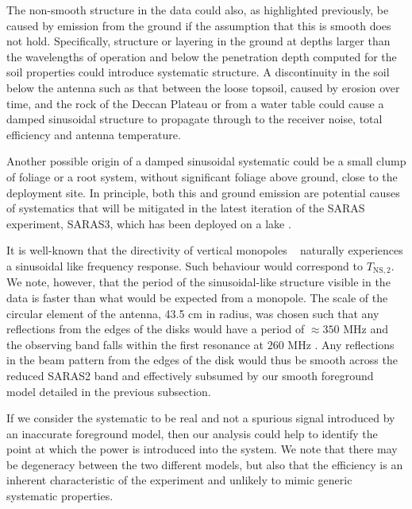 The non-smooth structure in the data could also, as highlighted previously, be caused by emission from the ground if the assumption that this is smooth does not hold. Specifically, structure or layering in the ground at depths larger than the wavelengths of operation and below the penetration depth computed for the soil properties could introduce systematic structure. A discontinuity in the soil below the antenna such as that between the loose topsoil, caused by erosion over time, and the rock of the Deccan Plateau or from a water table could cause a damped sinusoidal structure to propagate through to the receiver noise, total efficiency and antenna temperature.

Another possible origin of a damped sinusoidal systematic could be a small clump of foliage or a root system, without significant foliage above ground, close to the deployment site. In principle, both this and ground emission are potential causes of systematics that will be mitigated in the latest iteration of the SARAS experiment, SARAS3, which has been deployed on a lake \citep{SARAS3_spectrometer_2020, SARAS_reciever_2021, SARAS3_antenna_2021}.

It is well-known that the directivity of vertical monopoles ~\citep{5492282} naturally experiences a sinusoidal like frequency response. Such behaviour would correspond to $T_\mathrm{NS, 2}$. We note, however, that the period of the sinusoidal-like structure visible in the data is faster than what would be expected from a monopole. The scale of the circular element of the antenna, 43.5 cm in radius, was chosen such that any reflections from the edges of the disks would have a period of $\approx 350$ MHz and the observing band falls within the first resonance at $260$ MHz \citep{Singh_saras2_2017, SARAS2_radiometer_2018}. Any reflections in the beam pattern from the edges of the disk would thus be smooth across the reduced SARAS2 band and effectively subsumed by our smooth foreground model detailed in the previous subsection.

If we consider the systematic to be real and not a spurious signal introduced by an inaccurate foreground model, then our analysis could help to identify the point at which the power is introduced into the system. We note that there may be degeneracy between the two different models, but also that the efficiency is an inherent characteristic of the experiment and unlikely to mimic generic systematic properties.

